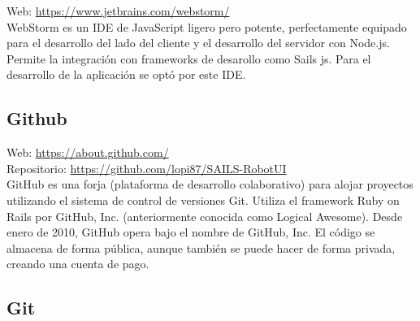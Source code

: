Web: \url{https://www.jetbrains.com/webstorm/}\\

WebStorm es un IDE de JavaScript ligero pero potente, perfectamente equipado para el desarrollo del lado del cliente y el desarrollo del servidor con Node.js. Permite la integración con frameworks de desarollo como Sails js. Para el desarrollo de la aplicación se optó por este IDE. \\

\subsection{Github}



Web: \url{https://about.github.com/}\\
Repositorio: \url{https://github.com/lopi87/SAILS-RobotUI}\\


GitHub es una forja (plataforma de desarrollo colaborativo) para alojar proyectos utilizando el sistema de control de versiones Git. Utiliza el framework Ruby on Rails por GitHub, Inc. (anteriormente conocida como Logical Awesome). Desde enero de 2010, GitHub opera bajo el nombre de GitHub, Inc. El código se almacena de forma pública, aunque también se puede hacer de forma privada, creando una cuenta de pago.


\subsection{Git}


